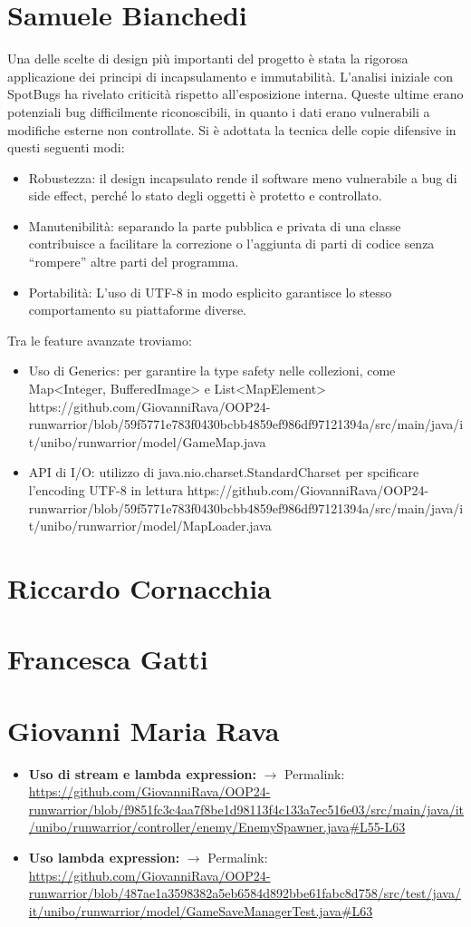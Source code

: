 \documentclass[a4paper,12pt]{report}
\begin{document}
\section{Samuele Bianchedi}
Una delle scelte di design più importanti del progetto è stata la rigorosa applicazione dei principi di incapsulamento e immutabilità.
L’analisi iniziale con SpotBugs ha rivelato criticità rispetto all’esposizione interna. 
Queste ultime erano potenziali bug difficilmente riconoscibili, in quanto i dati erano vulnerabili a modifiche esterne non controllate.
Si è adottata la tecnica delle copie difensive in questi seguenti modi:
\begin{itemize}
    \item Robustezza: il design incapsulato rende il software meno vulnerabile a bug di side effect, 
    perché lo stato degli oggetti è protetto e controllato.
    \item Manutenibilità: separando la parte pubblica e privata di una classe contribuisce a facilitare la correzione 
    o l’aggiunta di parti di codice senza “rompere” altre parti del programma.
    \item Portabilità: L’uso di UTF-8 in modo esplicito garantisce lo stesso comportamento su piattaforme diverse.
\end{itemize}
Tra le feature avanzate troviamo:
\begin{itemize}
    \item Uso di Generics: per garantire la type safety nelle collezioni, come Map<Integer, BufferedImage> e List<MapElement>
    https://github.com/GiovanniRava/OOP24-runwarrior/blob/59f5771e783f0430bcbb4859ef986df97121394a/src/main/java/it/unibo/runwarrior/model/GameMap.java
    \item API di I/O: utilizzo di java.nio.charset.StandardCharset per spcificare l’encoding UTF-8 in lettura
https://github.com/GiovanniRava/OOP24-runwarrior/blob/59f5771e783f0430bcbb4859ef986df97121394a/src/main/java/it/unibo/runwarrior/model/MapLoader.java
\end {itemize}
\section{Riccardo Cornacchia}
\section{Francesca Gatti}
\section{Giovanni Maria Rava}
\begin{itemize}
    \item \textbf{Uso di stream e lambda expression:} $\rightarrow$ Permalink:
    \url{https://github.com/GiovanniRava/OOP24-runwarrior/blob/f9851fc3c4aa7f8be1d98113f4c133a7ec516e03/src/main/java/it/unibo/runwarrior/controller/enemy/EnemySpawner.java#L55-L63}
    \item \textbf{Uso lambda expression:} $\rightarrow$ Permalink:
    \url{https://github.com/GiovanniRava/OOP24-runwarrior/blob/487ae1a3598382a5eb6584d892bbe61fabc8d758/src/test/java/it/unibo/runwarrior/model/GameSaveManagerTest.java#L63}
\end{itemize}
\end{document}
